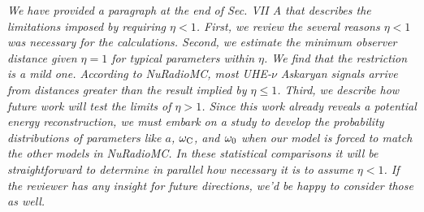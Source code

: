 \documentclass[12pt]{article}
\begin{document}
\begin{enumerate}
\textit{We have provided a paragraph at the end of Sec. VII A that describes the limitations imposed by requiring $\eta < 1$.  First, we review the several reasons $\eta < 1$ was necessary for the calculations.  Second, we estimate the minimum observer distance given $\eta = 1$ for typical parameters within $\eta$.  We find that the restriction is a mild one.  According to NuRadioMC, most UHE-$\nu$ Askaryan signals arrive from distances greater than the result implied by $\eta \leq 1$.  Third, we describe how future work will test the limits of $\eta > 1$.  Since this work already reveals a potential energy reconstruction, we must embark on a study to develop the probability distributions of parameters like $a$, $\omega_{\rm C}$, and $\omega_{\rm 0}$ when our model is forced to match the other models in NuRadioMC.  In these statistical comparisons it will be straightforward to determine in parallel how necessary it is to assume $\eta < 1$.  If the reviewer has any insight for future directions, we'd be happy to consider those as well.}
\end{enumerate}
\end{document}
